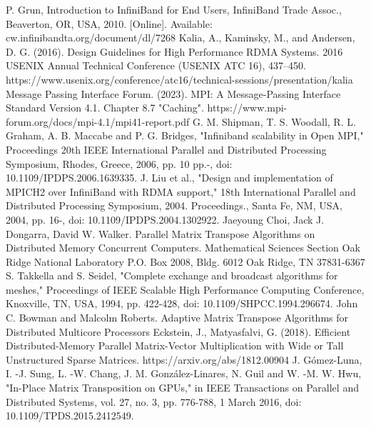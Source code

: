 \documentclass[conference]{IEEEtran}
\begin{document}
\begin{thebibliography}{00}
 P. Grun, Introduction to InfiniBand for End Users, InfiniBand
Trade Assoc., Beaverton, OR, USA, 2010. [Online]. Available:
cw.infinibandta.org/document/dl/7268
 Kalia, A., Kaminsky, M., and Andersen, D. G. (2016). Design Guidelines for High Performance RDMA Systems. 2016 USENIX Annual Technical Conference (USENIX ATC 16), 437–450. https://www.usenix.org/conference/atc16/technical-sessions/presentation/kalia 
 Message Passing Interface Forum. (2023). MPI: A Message-Passing Interface Standard Version 4.1. Chapter 8.7 "Caching". https://www.mpi-forum.org/docs/mpi-4.1/mpi41-report.pdf 
 G. M. Shipman, T. S. Woodall, R. L. Graham, A. B. Maccabe and P. G. Bridges, "Infiniband scalability in Open MPI," Proceedings 20th IEEE International Parallel and Distributed Processing Symposium, Rhodes, Greece, 2006, pp. 10 pp.-, doi: 10.1109/IPDPS.2006.1639335.
 J. Liu et al., "Design and implementation of MPICH2 over InfiniBand with RDMA support," 18th International Parallel and Distributed Processing Symposium, 2004. Proceedings., Santa Fe, NM, USA, 2004, pp. 16-, doi: 10.1109/IPDPS.2004.1302922.
 Jaeyoung Choi, Jack J. Dongarra, David W. Walker.  Parallel Matrix Transpose Algorithms on Distributed Memory Concurrent Computers.  Mathematical Sciences Section Oak Ridge National Laboratory P.O. Box 2008, Bldg. 6012 Oak Ridge, TN 37831-6367
 S. Takkella and S. Seidel, "Complete exchange and broadcast algorithms for meshes," Proceedings of IEEE Scalable High Performance Computing Conference, Knoxville, TN, USA, 1994, pp. 422-428, doi: 10.1109/SHPCC.1994.296674.
 John C. Bowman and Malcolm Roberts. Adaptive Matrix Transpose Algorithms for Distributed Multicore Processors
 Eckstein, J., Matyasfalvi, G. (2018). Efficient Distributed-Memory Parallel Matrix-Vector Multiplication with Wide or Tall Unstructured Sparse Matrices. https://arxiv.org/abs/1812.00904 
 J. Gómez-Luna, I. -J. Sung, L. -W. Chang, J. M. González-Linares, N. Guil and W. -M. W. Hwu, "In-Place Matrix Transposition on GPUs," in IEEE Transactions on Parallel and Distributed Systems, vol. 27, no. 3, pp. 776-788, 1 March 2016, doi: 10.1109/TPDS.2015.2412549.
\end{thebibliography}
\vspace{12pt}
\end{document}
